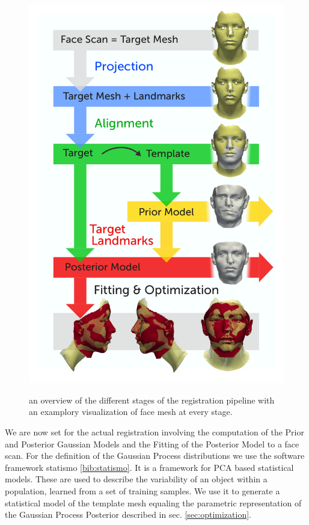 \begin{figure}[h!]
\centering
\includegraphics[width=.9\textwidth]{./resources/figures/pipeline.pdf}
\label{fig:pipeline}
\vspace{-20pt}
\caption{an overview of the different stages of the registration pipeline with an examplory visualization of face mesh at every stage.}
\end{figure}

We are now set for the actual registration involving the computation of the Prior and Posterior Gaussian Models and the Fitting of the Posterior Model to a face scan. For the definition of the Gaussian Process distributions we use the software framework statismo \ref{bib:statismo}. It is a framework for PCA based statistical models. These are used to describe the variability of an object within a population, learned from a set of training samples. We use it to generate a statistical
model of the template mesh equaling the parametric representation of the Gaussian Process Posterior described in sec. \ref{sec:optimization}. 

